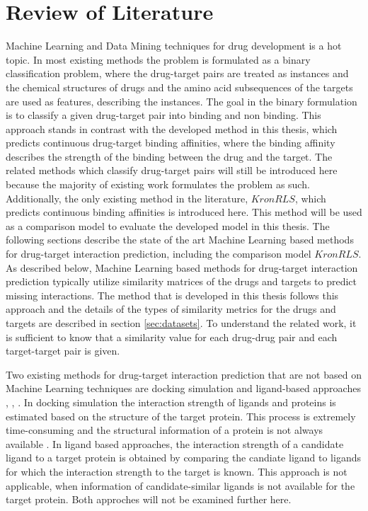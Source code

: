 \chapter{Review of Literature}
\label{chp:review}
Machine Learning and Data Mining techniques for drug development is a hot topic. In most existing methods the problem is formulated as a binary classification problem, where the drug-target pairs are treated as instances and the chemical structures of drugs and the amino acid subsequences of the targets are used as features, describing the instances. The goal in the binary formulation is to classify a given drug-target pair into binding and non binding. This approach stands in contrast with the developed method in this thesis, which predicts continuous drug-target binding affinities, where the binding affinity describes the strength of the binding between the drug and the target. The related methods which classify drug-target pairs will still be introduced here because the majority of existing work formulates the problem as such. Additionally, the only existing method in the literature, $KronRLS$, which predicts continuous binding affinities is introduced here. This method will be used as a comparison model to evaluate the developed model in this thesis. The following sections describe the state of the art Machine Learning based methods for drug-target interaction prediction, including the comparison model $KronRLS$. As described below, Machine Learning based methods for drug-target interaction prediction typically utilize similarity matrices of the drugs and targets to predict missing interactions. The method that is developed in this thesis follows this approach and the details of the types of similarity metrics for the drugs and targets are described in section \ref{sec:datasets}. To understand the related work, it is sufficient to know that a similarity value for each drug-drug pair and each target-target pair is given.

Two existing methods for drug-target interaction prediction that are not based on Machine Learning techniques are docking simulation and ligand-based approaches \cite{kinnings2009drug}, \cite{li2011computational}, \cite{wang2013prediction}. In docking simulation the interaction strength of ligands and proteins is estimated based on the structure of the target protein. This process is extremely time-consuming and the structural information of a protein is not always available \cite{liu2016neighborhood}. In ligand based approaches, the interaction strength of a candidate ligand to a target protein is obtained by comparing the candiate ligand to ligands for which the interaction strength to the target is known. This approach is not applicable, when information of candidate-similar ligands is not available for the target protein. Both approches  will not be examined further here. 

